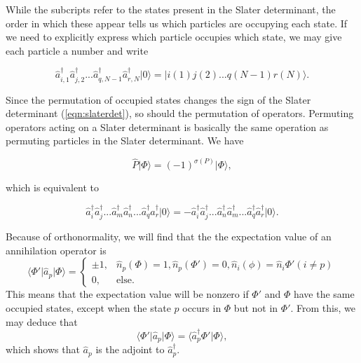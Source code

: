 While the subcripts refer to the states present in the Slater determinant, the order in which these appear tells us which particles are occupying each state. If we need to explicitly express which particle occupies which state, we may give each particle a number and write

\begin{equation}
\hat{a}_{i,1}^\dagger \hat{a}_{j,2}^\dagger  ... \hat{a}_{q,N-1}^\dagger \hat{a}_{r,N}^\dagger \vert 0 \rangle = \vert i(1)j(2) ... q(N-1)r(N) \rangle.
\label{eqn:createSD2}
\end{equation}

Since the permutation of occupied states changes the sign of the Slater determinant (\ref{eqn:slaterdet}), so should the permutation of operators. Permuting operators acting on a Slater determinant is basically the same operation as permuting particles in the Slater determinant. We have 

\begin{equation}
\hat{P} \vert \Phi \rangle = (-1)^{\sigma(P)} \vert \Phi \rangle,
\label{eqn:Permute2nquant}
\end{equation}

which is equivalent to

\begin{equation}
\hat{a}_i^\dagger \hat{a}_j^\dagger  ... \hat{a}_m^\dagger \hat{a}_n^\dagger ... \hat{a}_q^\dagger \hat{a}_r^\dagger \vert 0 \rangle = - \hat{a}_i^\dagger \hat{a}_j^\dagger  ... \hat{a}_n^\dagger \hat{a}_m^\dagger ... \hat{a}_q^\dagger \hat{a}_r^\dagger \vert 0 \rangle.
\label{eqn:permuteSD2}
\end{equation}

Because of orthonormality, we will find that the the expectation value of an annihilation operator is
\begin{equation}
\langle \Phi' \vert \hat{a}_p \vert \Phi \rangle = 
\begin{cases}
\pm 1,& \hat{n}_p(\Phi) = 1,  \hat{n}_p(\Phi') = 0,  \hat{n}_i(\phi) = \hat{n}_i{\Phi'}  (i \neq p) \\
0,& \mathrm{else}.
\end{cases}
\label{eqn:expvalue}
\end{equation}
This means that the expectation value will be nonzero if $\Phi'$ and $\Phi$ have the same 
occupied states, except when the state $p$ occurs in $\Phi$ but not in $\Phi'$. From this, we may deduce that
\begin{equation}
\langle \Phi' \vert \hat{a}_p \vert \Phi \rangle = \langle \hat{a}_p^\dagger \Phi' \vert \Phi \rangle,
\label{eqn:expvalue2}
\end{equation}
which shows that $\hat{a}_p$ is the adjoint to $ \hat{a}_p^\dagger $.


